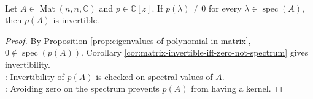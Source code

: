 \begin{corollary} \label{cor:polynomial-in-matrix-invertible-spectrum-test} \\
Let $A\in\operatorname{Mat}(n,n,\mathbb{C})$ and $p\in\mathbb{C}[z]$. If $p(\lambda)\neq0$ for every $\lambda\in\operatorname{spec}(A)$, then $p(A)$ is invertible.
\begin{proof}
By Proposition \ref{prop:eigenvalues-of-polynomial-in-matrix}, $0\notin\operatorname{spec}(p(A))$. Corollary \ref{cor:matrix-invertible-iff-zero-not-spectrum} gives invertibility.\\
: Invertibility of $p(A)$ is checked on spectral values of $A$.\\
: Avoiding zero on the spectrum prevents $p(A)$ from having a kernel.
\end{proof}
\end{corollary}
